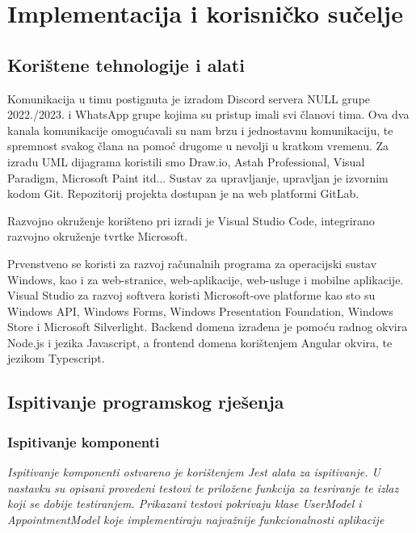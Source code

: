 \chapter{Implementacija i korisničko sučelje}
		
		
		\section{Korištene tehnologije i alati}
		
		    \texttt{}{
               Komunikacija u timu postignuta je izradom Discord servera NULL grupe 2022./2023. i WhatsApp grupe kojima su pristup imali svi članovi tima. Ova dva kanala komunikacije omogućavali su nam brzu i jednostavnu komunikaciju, te spremnost svakog člana na pomoć drugome u nevolji u kratkom vremenu. Za izradu UML dijagrama koristili smo Draw.io, Astah Professional, Visual Paradigm, Microsoft Paint itd... Sustav za upravljanje, upravljan je izvornim kodom Git. Repozitorij projekta dostupan je na web platformi GitLab. 

               Razvojno okruženje korišteno pri izradi je Visual Studio Code, integrirano razvojno okruženje tvrtke Microsoft. 

               Prvenstveno se koristi za razvoj računalnih programa za operacijski sustav Windows, kao i za web-stranice, web-aplikacije, web-usluge i mobilne aplikacije. Visual Studio za razvoj softvera koristi Microsoft-ove platforme kao sto su Windows API, Windows Forms, Windows Presentation Foundation, Windows Store i Microsoft Silverlight. Backend domena izrađena je pomoću radnog okvira Node.js i jezika Javascript, a frontend domena korištenjem Angular okvira, te jezikom Typescript. 
            }
			
			
			\eject 
		

		\section{Ispitivanje programskog rješenja}
	
			
			\subsection{Ispitivanje komponenti}
			\textit{Ispitivanje komponenti ostvareno je korištenjem Jest alata za ispitivanje. U nastavku su opisani provedeni testovi te priložene funkcija za tesriranje te izlaz koji se dobije testiranjem. Prikazani testovi pokrivaju klase UserModel i AppointmentModel koje implementiraju najvažnije funkcionalnosti aplikacije
                    }
    
